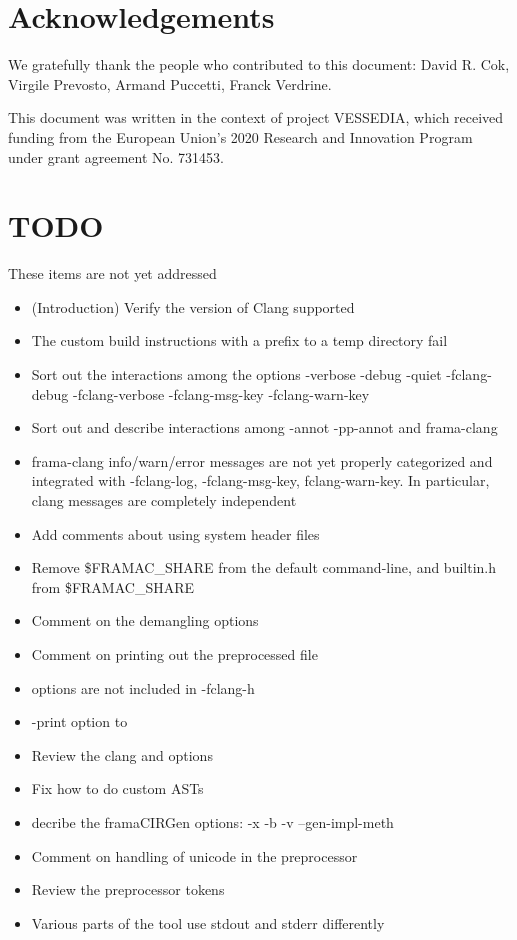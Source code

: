\documentclass[web]{frama-c-book}
\begin{document}
\section*{Acknowledgements}

We gratefully thank the people who contributed to this document:
David R. Cok, Virgile Prevosto, Armand Puccetti, Franck Verdrine.

This document was written in the context of project VESSEDIA,
which received funding from the European Union's 2020
Research and Innovation Program under grant agreement
No. 731453.

\section*{TODO}

These items are not yet addressed
\begin{itemize}
\item (Introduction) Verify the version of Clang supported
\item The custom build instructions with a prefix to a temp directory fail
\item Sort out the interactions among the options -verbose -debug -quiet -fclang-debug -fclang-verbose -fclang-msg-key -fclang-warn-key
\item Sort out and describe interactions among -annot -pp-annot and frama-clang
\item frama-clang info/warn/error messages are not yet properly categorized and integrated with -fclang-log, -fclang-msg-key, fclang-warn-key. In particular, clang messages are completely independent
\item Add comments about using system header files
\item Remove \$FRAMAC\_SHARE from the default command-line, and builtin.h from \$FRAMAC\_SHARE
\item Comment on the demangling options
\item Comment on printing out the preprocessed file
\item \irg options are not included in -fclang-h
\item -print option to \irg
\item Review the clang and \irg options
\item Fix how to do custom ASTs
\item decribe the framaCIRGen options: -x -b -v --gen-impl-meth
\item Comment on handling of unicode in the preprocessor
\item Review the preprocessor tokens
\item Various parts of the tool use stdout and stderr differently
\end{itemize}
\end{document}
